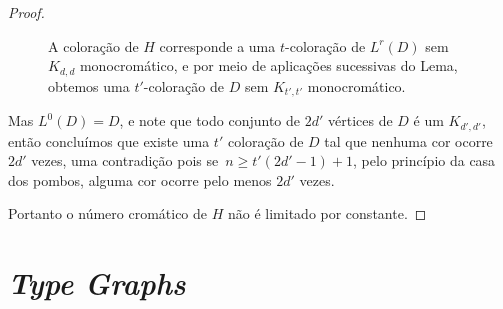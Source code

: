 \begin{proof}
\begin{figure}[H]
\centering
{}
\caption{A coloração de $H$ corresponde a uma $t$-coloração de $L^r(D)$ sem $K_{d,d}$ monocromático, e por meio de aplicações sucessivas do Lema, obtemos uma $t'$-coloração de $D$ sem $K_{t',t'}$ monocromático.}
\label{fig:shiftsequence}
\end{figure}

Mas $L^0(D) = D$, e note que todo conjunto de $2d'$ vértices de $D$ é um $K_{d',d'}$, então concluímos que existe uma $t'$ coloração de $D$ tal que nenhuma cor ocorre $2d'$ vezes, uma contradição pois se~$n \geq t'(2d'-1)+1$, pelo princípio da casa dos pombos, alguma cor ocorre pelo menos $2d'$ vezes.

Portanto o número cromático de $H$ não é limitado por constante.
\end{proof}


\section{\textit{Type Graphs}}

